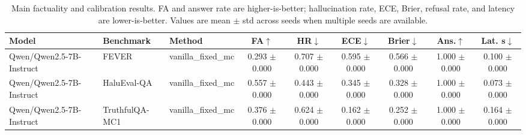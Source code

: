 \begin{table}[t]
\centering
\caption{Main factuality and calibration results. FA and answer rate are higher-is-better; hallucination rate, ECE, Brier, refusal rate, and latency are lower-is-better. Values are mean $\pm$ std across seeds when multiple seeds are available.}
\label{tab:main_results}
\small
\begin{tabular}{lllcccccc}
\toprule
Model & Benchmark & Method & FA$\uparrow$ & HR$\downarrow$ & ECE$\downarrow$ & Brier$\downarrow$ & Ans.$\uparrow$ & Lat. s$\downarrow$ \\
\midrule
Qwen/Qwen2.5-7B-Instruct & FEVER & vanilla\_fixed\_mc & 0.293 $\pm$ 0.000 & 0.707 $\pm$ 0.000 & 0.595 $\pm$ 0.000 & 0.566 $\pm$ 0.000 & 1.000 $\pm$ 0.000 & 0.100 $\pm$ 0.000 \\
Qwen/Qwen2.5-7B-Instruct & HaluEval-QA & vanilla\_fixed\_mc & 0.557 $\pm$ 0.000 & 0.443 $\pm$ 0.000 & 0.345 $\pm$ 0.000 & 0.328 $\pm$ 0.000 & 1.000 $\pm$ 0.000 & 0.073 $\pm$ 0.000 \\
Qwen/Qwen2.5-7B-Instruct & TruthfulQA-MC1 & vanilla\_fixed\_mc & 0.376 $\pm$ 0.000 & 0.624 $\pm$ 0.000 & 0.162 $\pm$ 0.000 & 0.252 $\pm$ 0.000 & 1.000 $\pm$ 0.000 & 0.164 $\pm$ 0.000 \\
\bottomrule
\end{tabular}
\end{table}
